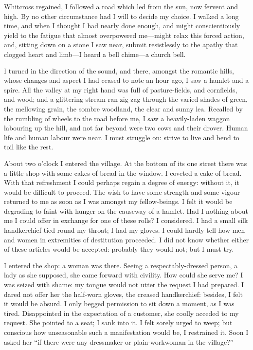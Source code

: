Whitcross regained, I followed a road which led from the sun, now
fervent and high. By no other circumstance had I will to decide my
choice. I walked a long time, and when I thought I had nearly done
enough, and might conscientiously yield to the fatigue that almost
overpowered me---might relax this forced action, and, sitting down on a
stone I saw near, submit resistlessly to the apathy that clogged heart
and limb---I heard a bell chime---a church bell.

I turned in the direction of the sound, and there, amongst the romantic
hills, whose changes and aspect I had ceased to note an hour ago, I saw
a hamlet and a spire. All the valley at my right hand was full of
pasture-fields, and cornfields, and wood; and a glittering stream ran
zig-zag through the varied shades of green, the mellowing grain, the
sombre woodland, the clear and sunny lea. Recalled by the rumbling of
wheels to the road before me, I saw a heavily-laden waggon labouring up
the hill, and not far beyond were two cows and their drover. Human life
and human labour were near. I must struggle on: strive to live and bend
to toil like the rest.

About two o'clock \PM{} I entered the village. At the bottom of its one
street there was a little shop with some cakes of bread in the window. 
I coveted a cake of bread. With that refreshment I could perhaps regain
a degree of energy: without it, it would be difficult to proceed. The
wish to have some strength and some vigour returned to me as soon as I
was amongst my fellow-beings. I felt it would be degrading to faint
with hunger on the causeway of a hamlet. Had I nothing about me I could
offer in exchange for one of these rolls? I considered. I had a small
silk handkerchief tied round my throat; I had my gloves. I could hardly
tell how men and women in extremities of destitution proceeded. I did
not know whether either of these articles would be accepted: probably
they would not; but I must try.

I entered the shop: a woman was there. Seeing a respectably-dressed
person, a lady as she supposed, she came forward with civility. How
could she serve me? I was seized with shame: my tongue would not utter
the request I had prepared. I dared not offer her the half-worn gloves,
the creased handkerchief: besides, I felt it would be absurd. I only
begged permission to sit down a moment, as I was tired. Disappointed in
the expectation of a customer, she coolly acceded to my request. She
pointed to a seat; I sank into it. I felt sorely urged to weep; but
conscious how unseasonable such a manifestation would be, I restrained
it. Soon I asked her \enquote{if there were any dressmaker or
plain-workwoman in the village?}

